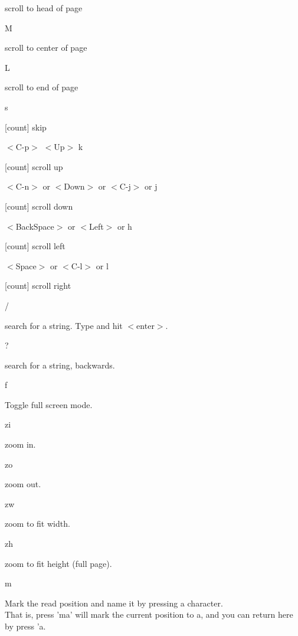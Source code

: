 \documentclass[a4paper,12pt]{article}
\newcommand{\apvlv}{\textsf{Apvlv{ }}}
\begin{document}
\begin{description}
scroll to head of page

\item M

scroll to center of page

\item L

scroll to end of page

\item s

[count] skip

\item $<$C-p$>$
$<$Up$>$
k

[count] scroll up

\item  $<$C-n$>$ or 
 $<$Down$>$ or 
 $<$C-j$>$ or 
 j

[count] scroll down

\item $<$BackSpace$>$ or 
$<$Left$>$ or 
h

[count] scroll left

\item $<$Space$>$ or 
$<$C-l$>$ or 
l

[count] scroll right

\item /

search for a string. Type and hit $<$enter$>$.

\item ?

search for a string, backwards.

\item f

Toggle full screen mode. %

\item zi

zoom in.

\item zo

zoom out.

\item zw

zoom to fit width.

\item zh

zoom to fit height (full page).

\item m

Mark the read position and name it by pressing a character. \\
That is, press 'ma' will mark the current position to a, and you can return here by press 'a.


\end{description}
\end{document}
